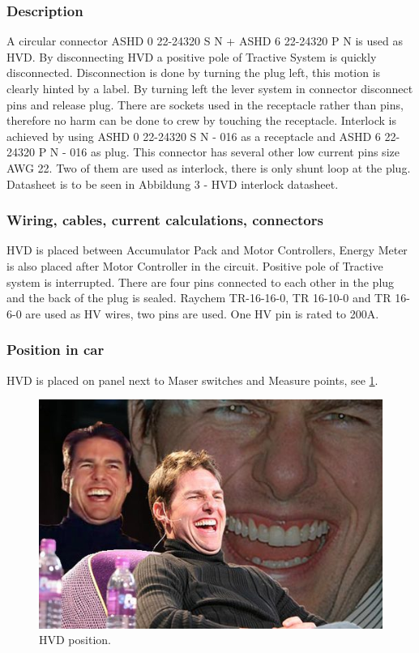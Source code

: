 \subsubsection{Description}

A circular connector ASHD 0 22-24320 S N + ASHD 6 22-24320 P N is used as HVD. By disconnecting HVD a positive pole of Tractive System is quickly disconnected. Disconnection is done by turning the plug left, this motion is clearly hinted by a label. By turning left the lever system in connector disconnect pins and release plug. There are sockets used in the receptacle rather than pins, therefore no harm can be done to crew by touching the receptacle. 
Interlock is achieved by using ASHD 0 22-24320 S N - 016 as a receptacle and ASHD 6 22-24320 P N - 016 as plug. This connector has several other low current pins size AWG 22. Two of them are used as interlock, there is only shunt loop at the plug.
Datasheet is to be seen in Abbildung 3 - HVD interlock datasheet.

\subsubsection{Wiring, cables, current calculations, connectors}

HVD is placed between Accumulator Pack and Motor Controllers, Energy Meter is also placed after Motor Controller in the circuit. Positive pole of Tractive system is interrupted. There are four pins connected to each other in the plug and the back of the plug is sealed. Raychem TR-16-16-0, TR 16-10-0 and TR 16-6-0 are used as HV wires, two pins are used. One HV pin is rated to 200A.

\subsubsection{Position in car}

HVD is placed on panel next to Maser switches and Measure points, see \ref{fig:hvd-position}.

\begin{figure}[H]
	\centering
	\includegraphics[width=\textwidth]{./img/hvd-position.jpg}
	\caption{HVD position.}
	\label{fig:hvd-position}
\end{figure}
